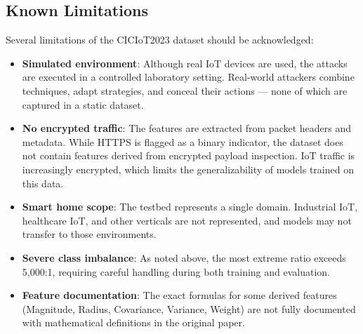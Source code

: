 \subsection{Known Limitations}
\label{subsec:dataset_limitations}

\par Several limitations of the CICIoT2023 dataset should be acknowledged:

\begin{itemize}
    \item \textbf{Simulated environment}: Although real IoT devices are used, the attacks are executed in a controlled laboratory setting. Real-world attackers combine techniques, adapt strategies, and conceal their actions --- none of which are captured in a static dataset.
    \item \textbf{No encrypted traffic}: The features are extracted from packet headers and metadata. While HTTPS is flagged as a binary indicator, the dataset does not contain features derived from encrypted payload inspection. IoT traffic is increasingly encrypted, which limits the generalizability of models trained on this data.
    \item \textbf{Smart home scope}: The testbed represents a single domain. Industrial IoT, healthcare IoT, and other verticals are not represented, and models may not transfer to those environments.
    \item \textbf{Severe class imbalance}: As noted above, the most extreme ratio exceeds 5,000:1, requiring careful handling during both training and evaluation.
    \item \textbf{Feature documentation}: The exact formulas for some derived features (Magnitude, Radius, Covariance, Variance, Weight) are not fully documented with mathematical definitions in the original paper.
\end{itemize}
